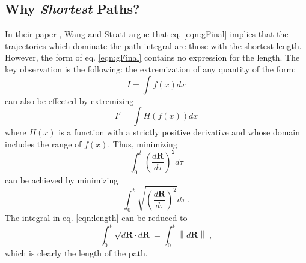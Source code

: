 \documentclass[letterpaper,12pt]{article}
\renewcommand{\vec}[1]{\mathbf{#1}}
\newcommand{\norm}[1]{\left\lVert#1\right\rVert}
\renewcommand{\refeq}[1]{eq. \ref{eqn:#1}}
\begin{document}
\subsection*{Why \emph{Shortest} Paths?}
In their paper \cite{wang:2007:geodesics}, Wang and Stratt argue that \refeq{gFinal} implies that the trajectories which dominate the path integral are those with the shortest length. However, the form of \refeq{gFinal} contains no expression for the length.  The key observation is the following: the extremization of any quantity of the form:
\begin{equation}
I = \int f(x)dx
\end{equation}
can also be effected by extremizing 
\begin{equation}
I' = \int H(f(x))dx
\end{equation}
where $H(x)$ is a function with a strictly positive derivative and  whose domain includes the range of $f(x)$. Thus, minimizing
\begin{equation}
\int_{0}^{t} {\left(\frac{d\vec{R}}{d\tau} \right)}^{2} d\tau
\end{equation}
can be achieved by minimizing 
\begin{equation} \label{eqn:length}
\int_{0}^{t} \sqrt{{\left(\frac{d\vec{R}}{d\tau} \right)}^{2}} d\tau \; .
\end{equation}
The integral in  \refeq{length} can be reduced to
\begin{equation}
\int_{0}^{t} \sqrt{d\vec{R} \cdot d\vec{R}} = \int_{0}^{t} \norm{d\vec{R}} \; ,
\end{equation}
which is clearly the length of the path.



\end{document}
